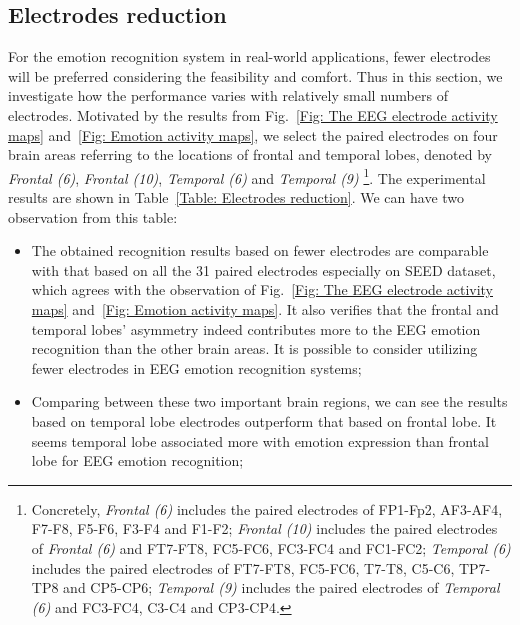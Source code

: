 \documentclass[journal]{IEEEtran}
\begin{document}
\subsection{Electrodes reduction}
For the emotion recognition system in real-world applications, fewer electrodes will be preferred considering the feasibility and comfort. Thus in this section, we investigate how the performance varies with relatively small numbers of electrodes. Motivated by the results from Fig.~\ref{Fig: The EEG electrode activity maps} and~\ref{Fig: Emotion activity maps}, we select the paired electrodes on four brain areas referring to the locations of frontal and temporal lobes, denoted by \textit{Frontal (6)}, \textit{Frontal (10)}, \textit{Temporal (6)} and \textit{Temporal (9)} \footnote{Concretely, \textit{Frontal (6)} includes the paired electrodes of FP1-Fp2, AF3-AF4, F7-F8, F5-F6, F3-F4 and F1-F2; \textit{Frontal (10)} includes the paired electrodes of \textit{Frontal (6)} and FT7-FT8, FC5-FC6, FC3-FC4 and FC1-FC2; \textit{Temporal (6)} includes the paired electrodes of FT7-FT8, FC5-FC6, T7-T8, C5-C6, TP7-TP8 and CP5-CP6; \textit{Temporal (9)} includes the paired electrodes of \textit{Temporal (6)} and FC3-FC4, C3-C4 and CP3-CP4.}. The experimental results are shown in Table~\ref{Table: Electrodes reduction}. We can have two observation from this table:
\begin{itemize}
	 \item [(1)] The obtained recognition results based on fewer electrodes are comparable with that based on all the 31 paired electrodes especially on SEED dataset, which agrees with the observation of Fig.~\ref{Fig: The EEG electrode activity maps} and~\ref{Fig: Emotion activity maps}. It also verifies that the frontal and temporal lobes' asymmetry indeed contributes more to the EEG emotion recognition than the other brain areas. It is possible to consider utilizing fewer electrodes in EEG emotion recognition systems;
	 \item [(2)] Comparing between these two important brain regions, we can see the results based on temporal lobe electrodes outperform that based on frontal lobe. It seems temporal lobe associated more with emotion expression than frontal lobe for EEG emotion recognition;
\end{itemize}
\end{document}
